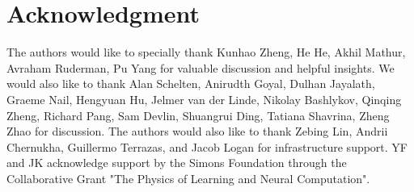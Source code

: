 \section*{Acknowledgment}

The authors would like to specially thank Kunhao Zheng, He He, Akhil Mathur, Avraham Ruderman, Pu Yang for valuable discussion and helpful insights. We would also like to thank Alan Schelten, Anirudth Goyal, Dulhan Jayalath, Graeme Nail, Hengyuan Hu, Jelmer van der Linde, Nikolay Bashlykov, Qinqing Zheng, Richard Pang, Sam Devlin, Shuangrui Ding, Tatiana Shavrina, Zheng Zhao for discussion. The authors would also like to thank Zebing Lin, Andrii Chernukha, Guillermo Terrazas, and Jacob Logan for infrastructure support. YF and JK acknowledge support by the Simons Foundation through the Collaborative Grant "The Physics of Learning and Neural Computation". %